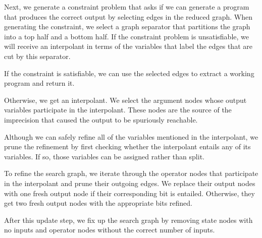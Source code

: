 \documentclass[review]{acmart}
\begin{document}
Next, we generate a constraint problem that asks if we can generate a program
that produces the correct output by selecting edges in the reduced graph. When
generating the constraint, we select a graph separator that partitions the graph
into a top half and a bottom half. If the constraint problem is unsatisfiable,
we will receive an interpolant in terms of the variables that label the edges
that are cut by this separator.

If the constraint is satisfiable, we can use the selected edges to extract a
working program and return it.

Otherwise, we get an interpolant. We select the argument nodes whose output
variables participate in the interpolant. These nodes are the source of the
imprecision that caused the output to be spuriously reachable.

Although we can safely refine all of the variables mentioned in the interpolant,
we prune the refinement by first checking whether the interpolant entails any of
its variables. If so, those variables can be assigned rather than split.

To refine the search graph, we iterate through the operator nodes that
participate in the interpolant and prune their outgoing edges. We replace their
output nodes with one fresh output node if their corresponding bit is entailed.
Otherwise, they get two fresh output nodes with the appropriate bits refined.

After this update step, we fix up the search graph by removing state nodes with
no inputs and operator nodes without the correct number of inputs.


\end{document}
